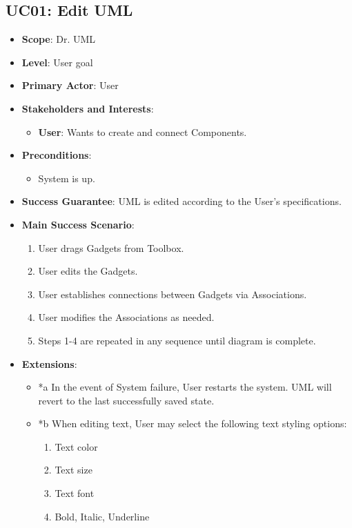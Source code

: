 \documentclass[12pt]{article}
\begin{document}
\subsection{UC01: Edit UML}
\begin{itemize}
    \item \textbf{Scope}: Dr. UML
    \item \textbf{Level}: User goal
    \item \textbf{Primary Actor}: User
    \item \textbf{Stakeholders and Interests}:
    \begin{itemize}
        \item \textbf{User}: Wants to create and connect Components.
    \end{itemize}
    \item \textbf{Preconditions}:
    \begin{itemize}
        \item System is up.
    \end{itemize}
    \item \textbf{Success Guarantee}: UML is edited according to the User’s specifications.
    \item \textbf{Main Success Scenario}:
    \begin{enumerate}
        \item User drags Gadgets from Toolbox.
        \item User edits the Gadgets.
        \item User establishes connections between Gadgets via Associations.
        \item User modifies the Associations as needed.
        \item Steps 1-4 are repeated in any sequence until diagram is complete.
    \end{enumerate}
    \item \textbf{Extensions}:
    \begin{itemize}
        \item *a In the event of System failure, User restarts the system. UML will revert to the last successfully saved state.
        \item *b When editing text, User may select the following text styling options:
        \begin{enumerate}
            \item Text color
            \item Text size
            \item Text font
            \item Bold, Italic, Underline

\end{enumerate}
\end{itemize}
\end{itemize}
\end{document}
